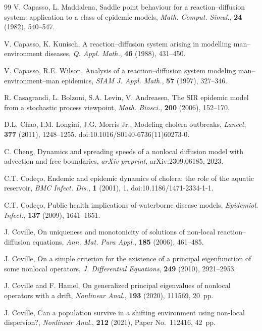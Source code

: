 \documentclass[a4paper,11pt]{amsart}
\theoremstyle{definition}
\numberwithin{equation}{section}
\theoremstyle{definition}
\begin{document}
\begin{thebibliography}{99}
V. Capasso, L. Maddalena,
Saddle point behaviour for a reaction--diffusion system: application to a class of epidemic models,
\textit{Math. Comput. Simul.}, \textbf{24} (1982), 540--547.

V. Capasso, K. Kunisch,
A reaction--diffusion system arising in modelling man--environment diseases,
\textit{Q. Appl. Math.}, \textbf{46} (1988), 431--450.

V. Capasso, R.E. Wilson,
Analysis of a reaction--diffusion system modeling man--environment--man epidemics,
\textit{SIAM J. Appl. Math.}, \textbf{57} (1997), 327--346.

R. Casagrandi, L. Bolzoni, S.A. Levin, V. Andreasen,
The SIR epidemic model from a stochastic process viewpoint,
\textit{Math. Biosci.}, \textbf{200} (2006), 152--170.

D.L. Chao, I.M. Longini, J.G. Morris Jr.,
Modeling cholera outbreaks,
\textit{Lancet}, \textbf{377} (2011), 1248--1255.
doi:10.1016/S0140-6736(11)60273-0.



C. Cheng,
Dynamics and spreading speeds of a nonlocal diffusion model with advection and free boundaries,
\textit{arXiv preprint}, arXiv:2309.06185, 2023.

C.T. Codeço,
Endemic and epidemic dynamics of cholera: the role of the aquatic reservoir,
\textit{BMC Infect. Dis.}, \textbf{1} (2001), 1.
doi:10.1186/1471-2334-1-1.



C.T. Codeço,
Public health implications of waterborne disease models,
\textit{Epidemiol. Infect.}, \textbf{137} (2009), 1641--1651.

J. Coville,
On uniqueness and monotonicity of solutions of non-local reaction--diffusion equations,
\textit{Ann. Mat. Pura Appl.}, \textbf{185} (2006), 461--485.

J. Coville,
On a simple criterion for the existence of a principal eigenfunction of some nonlocal operators,
\textit{J. Differential Equations}, \textbf{249} (2010), 2921--2953.

J. Coville and F. Hamel,
On generalized principal eigenvalues of nonlocal operators with a drift,
\textit{Nonlinear Anal.}, \textbf{193} (2020), 111569, 20~pp.

J. Coville,
Can a population survive in a shifting environment using non-local dispersion?,
\textit{Nonlinear Anal.}, \textbf{212} (2021), Paper No.~112416, 42~pp.


\end{thebibliography}
\end{document}
